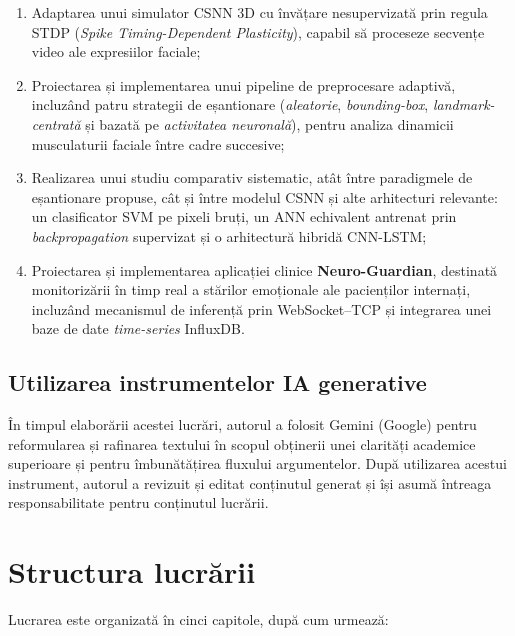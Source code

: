 \begin{enumerate}
	\item Adaptarea unui simulator CSNN 3D cu învățare nesupervizată prin regula STDP (\textit{Spike Timing-Dependent Plasticity}), capabil să proceseze secvențe video ale expresiilor faciale;
	
	\item Proiectarea și implementarea unui pipeline de preprocesare adaptivă, incluzând patru strategii de eșantionare (\textit{aleatorie}, \textit{bounding-box}, \textit{landmark-centrată} și bazată pe \textit{activitatea neuronală}), pentru analiza dinamicii musculaturii faciale între cadre succesive;
	
	\item Realizarea unui studiu comparativ sistematic, atât între paradigmele de e\-șan\-ti\-o\-na\-re propuse, cât și între modelul CSNN și alte arhitecturi relevante: un clasificator SVM pe pixeli bruți, un ANN echivalent antrenat prin \textit{backpropagation} supervizat și o arhitectură hibridă CNN-LSTM;
	
	\item Proiectarea și implementarea aplicației clinice \textbf{Neuro-Guardian}, destinată monitorizării în timp real a stărilor emoționale ale pacienților internați, incluzând mecanismul de inferență prin WebSocket–TCP și integrarea unei baze de date \textit{time-series} InfluxDB.
\end{enumerate}

\section*{Utilizarea instrumentelor IA generative}
În timpul elaborării acestei lucrări, autorul a folosit Gemini (Google) pentru reformularea și rafinarea textului în scopul obținerii unei clarități academice superioare și pentru îmbunătățirea fluxului argumentelor. După utilizarea acestui instrument, autorul a revizuit și editat conținutul generat și își asumă întreaga responsabilitate pentru conținutul lucrării.


\chapter*{Structura lucrării}

Lucrarea este organizată în cinci capitole, după cum urmează:

